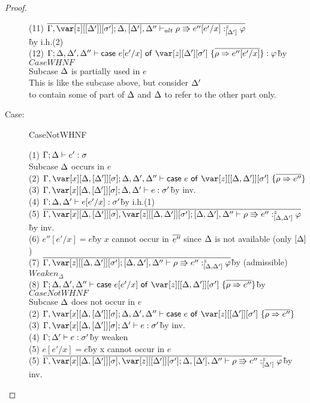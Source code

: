 \begin{proof}
\begin{description}
\begin{tabbing}
    (11) $\ov{\G,\z[\irr{\D'}][\s']; \D,[\D'],\D'' \vdash_{alt} \rho \Rrightarrow e''[e'/x] :^z_{\irr{\D'}} \vp}$\\\` by i.h.(2)\\
    (12) $\G;\D,\D',\D'' \vdash \ccase{e[e'/x]}{\z[\D'][\s']~\{\ov{\rho \Rightarrow e''[e'/x]}\}} : \vp$\` by $CaseWHNF$\\
    Subcase $\Delta$ is partially used in $e$\\
    This is like the subcase above, but consider $\Delta'$\\
    to contain some of part of $\Delta$ and $\Delta$ to refer to the other part only.
\end{tabbing}

\item[Case:] CaseNotWHNF
\begin{tabbing}
    (1) $\Gamma;\Delta\vdash e' :\sigma$\\
    Subcase $\Delta$ occurs in $e$\\
    (2) $\G,\xD; \D, \D', \D'' \vdash \ccase{e}{\z[\irr{\D,\D'}][\s']~\{\ov{\rho\Rightarrow e''}\}}$\\
    (3) $\G,\xD; \D, \D' \vdash e : \s'$\` by inv.\\
    (4) $\Gamma; \Delta,\Delta' \vdash e[e'/x] : \sigma'$\` by i.h.(1)\\
    (5) $\ov{\G,\xD,\z[\irr{\D,\D'}][\s']; [\D,\D'],\D'' \vdash \rho \Rrightarrow e'' :^z_{\irr{\D,\D'}} \vp}$\` by inv.\\
    (6) $e''[e'/x] = e$\` by $x$ cannot occur in $\overline{e''}$ since $\Delta$ is not available (only $\left[\Delta\right]$)\\
    (7) $\ov{\G,\z[\irr{\D,\D'}][\s']; [\D,\D'],\D'' \vdash \rho \Rrightarrow e'' :^z_{\irr{\D,\D'}} \vp}$\` by (admissible) $Weaken_\Delta$\\
    (8) $\G; \D, \D', \D'' \vdash \ccase{e[e'/x]}{\z[\irr{\D,\D'}][\s']~\{\ov{\rho\Rightarrow e''}\}}$\`by $CaseNotWHNF$\\
    Subcase $\Delta$ does not occur in $e$\\
    (2) $\G,\xD; \D, \D', \D'' \vdash \ccase{e}{\z[\irr{\D'}][\s']~\{\ov{\rho\Rightarrow e''}\}}$\\
    (3) $\G,\xD; \D' \vdash e : \s'$\` by inv.\\
    (4) $\Gamma; \Delta' \vdash e : \sigma'$\` by weaken\\
    (5) $e[e'/x] = e$\` by x cannot occur in $e$\\
    (5) $\ov{\G,\xD,\z[\irr{\D'}][\s']; \D,[\D'],\D'' \vdash\rho \Rrightarrow e'' :^z_{\irr{\D'}} \vp}$\` by inv.\\

\end{tabbing}
\end{description}
\end{proof}
